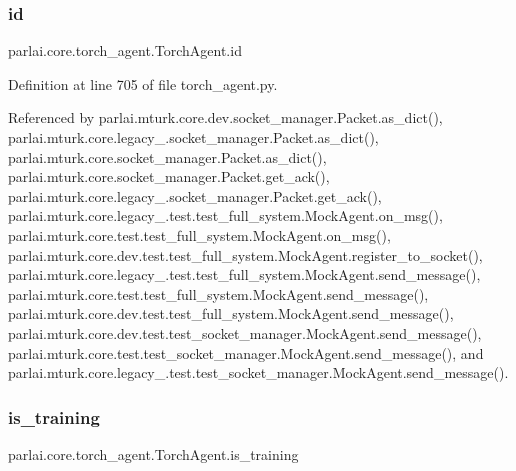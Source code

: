\subsubsection{\texorpdfstring{id}{id}}
{\footnotesize\ttfamily parlai.\+core.\+torch\+\_\+agent.\+Torch\+Agent.\+id}



Definition at line 705 of file torch\+\_\+agent.\+py.



Referenced by parlai.\+mturk.\+core.\+dev.\+socket\+\_\+manager.\+Packet.\+as\+\_\+dict(), parlai.\+mturk.\+core.\+legacy\+\_.\+socket\+\_\+manager.\+Packet.\+as\+\_\+dict(), parlai.\+mturk.\+core.\+socket\+\_\+manager.\+Packet.\+as\+\_\+dict(), parlai.\+mturk.\+core.\+socket\+\_\+manager.\+Packet.\+get\+\_\+ack(), parlai.\+mturk.\+core.\+legacy\+\_.\+socket\+\_\+manager.\+Packet.\+get\+\_\+ack(), parlai.\+mturk.\+core.\+legacy\+\_.\+test.\+test\+\_\+full\+\_\+system.\+Mock\+Agent.\+on\+\_\+msg(), parlai.\+mturk.\+core.\+test.\+test\+\_\+full\+\_\+system.\+Mock\+Agent.\+on\+\_\+msg(), parlai.\+mturk.\+core.\+dev.\+test.\+test\+\_\+full\+\_\+system.\+Mock\+Agent.\+register\+\_\+to\+\_\+socket(), parlai.\+mturk.\+core.\+legacy\+\_.\+test.\+test\+\_\+full\+\_\+system.\+Mock\+Agent.\+send\+\_\+message(), parlai.\+mturk.\+core.\+test.\+test\+\_\+full\+\_\+system.\+Mock\+Agent.\+send\+\_\+message(), parlai.\+mturk.\+core.\+dev.\+test.\+test\+\_\+full\+\_\+system.\+Mock\+Agent.\+send\+\_\+message(), parlai.\+mturk.\+core.\+dev.\+test.\+test\+\_\+socket\+\_\+manager.\+Mock\+Agent.\+send\+\_\+message(), parlai.\+mturk.\+core.\+test.\+test\+\_\+socket\+\_\+manager.\+Mock\+Agent.\+send\+\_\+message(), and parlai.\+mturk.\+core.\+legacy\+\_.\+test.\+test\+\_\+socket\+\_\+manager.\+Mock\+Agent.\+send\+\_\+message().

\mbox{\label{classparlai_1_1core_1_1torch__agent_1_1TorchAgent_ab0bd6456c94dfd9afae73b86f05016cf}} 
\subsubsection{\texorpdfstring{is\+\_\+training}{is\_training}}
{\footnotesize\ttfamily parlai.\+core.\+torch\+\_\+agent.\+Torch\+Agent.\+is\+\_\+training}



